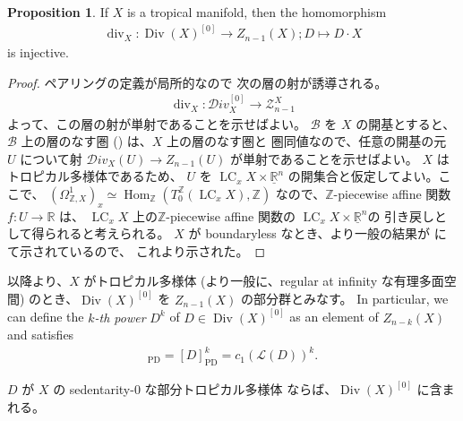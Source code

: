 \documentclass[a4paper,dvipdfmx,reqno,12pt]{amsart}
\theoremstyle{definition}
\newtheorem{proposition}[theorem]{Proposition}
\newcommand{\opn}[1]{\operatorname{#1}}
\newcommand{\PD}[1]{[#1]_{\mathrm{PD}}}
\numberwithin{equation}{section}
\begin{document}
\begin{proposition}
If $X$ is a tropical manifold, then the homomorphism
\begin{align}
\opn{div}_X\colon
\opn{Div}(X)^{[0]}\to Z_{n-1}(X); D\mapsto D\cdot X    
\end{align}
is injective.
\end{proposition}
\begin{proof}
ペアリングの定義が局所的なので
次の層の射が誘導される。
\begin{align}
\opn{div}_X\colon \mathcal{D}iv_X^{[0]}\to 
\mathscr{Z}_{n-1}^{X}
\end{align}
よって、この層の射が単射であることを示せばよい。
$\mathcal{B}$ を $X$ の開基とすると、
$\mathcal{B}$ 上の層のなす圏
(\cite[p.49-50]{MR2675155})
は、$X$ 上の層のなす圏と
圏同値なので、任意の開基の元 $U$ について射
$\mathcal{D}iv_X(U)\to Z_{n-1}(U)$
が単射であることを示せばよい。
$X$ はトロピカル多様体であるため、
$U$ を 
$\opn{LC}_x X\times \underline{\mathbb{R}}^{n}$
の開集合と仮定してよい。ここで、
$(\Omega_{\mathbb{Z},X}^{1})_{x}
\simeq \opn{Hom}_{\mathbb{Z}}
(T^{\mathbb{Z}}_0 (\opn{LC}_x X),\mathbb{Z})$
なので、$\mathbb{Z}$-piecewise affine 関数
$f\colon U\to \mathbb{R}$ は、
$\opn{LC}_x X$ 上の$\mathbb{Z}$-piecewise affine 関数の
$\opn{LC}_x X\times \underline{\mathbb{R}}^{n}$の
引き戻しとして得られると考えられる。
$X$ が boundaryless なとき、より一般の結果が
\cite[Theorem 4.5]{MR4246795} にて示されているので、
これより示された。
\end{proof}

以降より、$X$ がトロピカル多様体
(より一般に、regular at infinity な有理多面空間)
のとき、$\opn{Div}(X)^{[0]}$ を 
$Z_{n-1}(X)$ の部分群とみなす。
In particular, we can define the \emph{$k$-th power}
$D^{k}$ of $D\in \opn{Div}(X)^{[0]}$ as an element
of $Z_{n-k}(X)$ and satisfies
\begin{align}
\PD{D^{k}}=\PD{D}^{k}=c_1(\mathcal{L}(D))^{k}.
\end{align}

$D$ が $X$ の sedentarity-0 な部分トロピカル多様体
ならば、$\opn{Div}(X)^{[0]}$ に含まれる。
\end{document}

